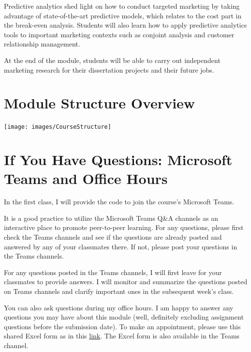 \documentclass[
  11pt,
]{book}
\begin{document}
Predictive analytics shed light on how to conduct targeted marketing by taking advantage of state-of-the-art predictive models, which relates to the cost part in the break-even analysis. Students will also learn how to apply predictive analytics tools to important marketing contexts such as conjoint analysis and customer relationship management.

At the end of the module, students will be able to carry out independent marketing research for their dissertation projects and their future jobs.

\hypertarget{module-structure-overview}{%
\section{Module Structure Overview}\label{module-structure-overview}}

\begin{center}\texttt{[image: images/CourseStructure]} \end{center}

\hypertarget{if-you-have-questions-microsoft-teams-and-office-hours}{%
\section{If You Have Questions: Microsoft Teams and Office Hours}\label{if-you-have-questions-microsoft-teams-and-office-hours}}

In the first class, I will provide the code to join the course's Microsoft Teams.

It is a good practice to utilize the Microsoft Teams Q\&A channels as an interactive place to promote peer-to-peer learning. For any questions, please first check the Teams channels and see if the questions are already posted and answered by any of your classmates there. If not, please post your questions in the Teams channels.

For any questions posted in the Teams channels, I will first leave for your classmates to provide answers. I will monitor and summarize the questions posted on Teams channels and clarify important ones in the subsequent week's class.

You can also ask questions during my office hours. I am happy to answer any questions you may have about this module (well, definitely excluding assignment questions before the submission date). To make an appointment, please use this shared Excel form as in this \href{https://liveuclac.sharepoint.com/:x:/s/MSIN0094MarketingAnalytics-2021-2022/EWD_4NkH-NhEqyw7Ab3wbBABtAotIn4TjsK7TrvQFeBTOw?e=mSbfAq}{link}. The Excel form is also available in the Teams channel.
\end{document}
